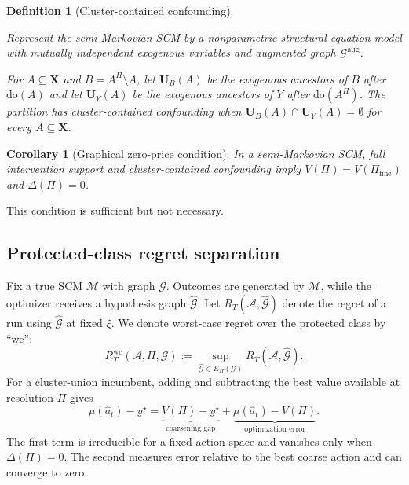 \documentclass[twoside]{article}
\newtheorem{definition}{Definition}
\newtheorem{corollary}{Corollary}
\newcommand{\doo}{\mathrm{do}}
\newcommand{\Gg}{\mathcal{G}}
\begin{document}
\begin{definition}[Cluster-contained confounding]
\label{def:ccc}

Represent the semi-Markovian SCM by a nonparametric structural equation model with mutually independent exogenous variables and augmented graph $\Gg^{\mathrm{aug}}$.

 
For $A\subseteq\mathbf X$ and $B=A^\Pi\setminus A$, let $\mathbf U_B(A)$ be the exogenous ancestors of $B$ after $\doo(A)$ and let $\mathbf U_Y(A)$ be the exogenous ancestors of $Y$ after $\doo(A^\Pi)$. The partition has cluster-contained confounding when $\mathbf U_B(A)\cap\mathbf U_Y(A)=\emptyset$ for every $A\subseteq\mathbf X$.
\end{definition}

\begin{corollary}[Graphical zero-price condition]
\label{cor:zero-price}
In a semi-Markovian SCM, full intervention support and cluster-contained confounding imply $V(\Pi)=V(\Pi_{\mathrm{fine}})$ and $\Delta(\Pi)=0$.
\end{corollary}

This condition is sufficient but not necessary. 

\subsection{Protected-class regret separation}
\label{sec:separation}

Fix a true SCM $\mathcal M$ with graph $\Gg$. Outcomes are generated by $\mathcal M$, while the optimizer receives a hypothesis graph $\widehat{\mathcal G}$. Let $R_T(\mathcal A,\widehat{\mathcal G})$ denote the regret of a run using $\widehat{\mathcal G}$ at fixed $\xi$. We denote worst-case regret over the protected class by ``wc'':
\[
 R_T^{\mathrm{wc}}(\mathcal A,\Pi,\Gg)
 :=\sup_{\widehat{\mathcal G}\in E_\Pi(\Gg)}R_T(\mathcal A,\widehat{\mathcal G}).
\]
For a cluster-union incumbent, adding and subtracting the best value available at resolution $\Pi$ gives
\begin{equation}
 \mu(\hat a_t)-y^\star
 =\underbrace{V(\Pi)-y^\star}_{\text{coarsening gap}}
 +\underbrace{\mu(\hat a_t)-V(\Pi)}_{\text{optimization error}}.
 \label{eq:regret-decomposition}
\end{equation}
The first term is irreducible for a fixed action space and vanishes only when $\Delta(\Pi)=0$. The second measures error relative to the best coarse action and can converge to zero.
\end{document}
